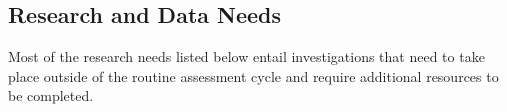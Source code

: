 \documentclass[11pt,
  english,
  a4paper,
]{article}
\begin{document}
\clearpage


\hypertarget{research-and-data-needs}{%
\subsection*{Research and Data Needs}\label{research-and-data-needs}}

\leavevmode\tagmcend\tagstructend


Most of the research needs listed below entail investigations that need to take place outside of the routine assessment cycle and require additional resources to be completed.

\leavevmode\tagmcend\tagstructend\par

\end{document}
